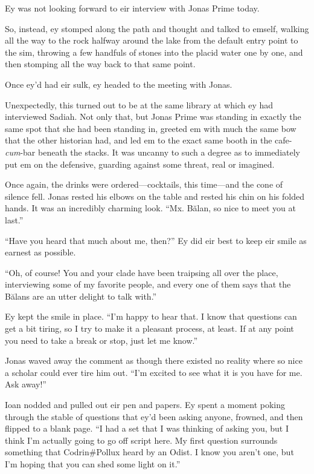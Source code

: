 Ey was not looking forward to eir interview with Jonas Prime today.

So, instead, ey stomped along the path and thought and talked to emself, walking all the way to the rock halfway around the lake from the default entry point to the sim, throwing a few handfuls of stones into the placid water one by one, and then stomping all the way back to that same point.

Once ey'd had eir sulk, ey headed to the meeting with Jonas.

Unexpectedly, this turned out to be at the same library at which ey had interviewed Sadiah. Not only that, but Jonas Prime was standing in exactly the same spot that she had been standing in, greeted em with much the same bow that the other historian had, and led em to the exact same booth in the cafe-\emph{cum}-bar beneath the stacks. It was uncanny to such a degree as to immediately put em on the defensive, guarding against some threat, real or imagined.

Once again, the drinks were ordered---cocktails, this time---and the cone of silence fell. Jonas rested his elbows on the table and rested his chin on his folded hands. It was an incredibly charming look. ``Mx. Bălan, so nice to meet you at last.''

``Have you heard that much about me, then?'' Ey did eir best to keep eir smile as earnest as possible.

``Oh, of course! You and your clade have been traipsing all over the place, interviewing some of my favorite people, and every one of them says that the Bălans are an utter delight to talk with.''

Ey kept the smile in place. ``I'm happy to hear that. I know that questions can get a bit tiring, so I try to make it a pleasant process, at least. If at any point you need to take a break or stop, just let me know.''

Jonas waved away the comment as though there existed no reality where so nice a scholar could ever tire him out. ``I'm excited to see what it is you have for me. Ask away!''

Ioan nodded and pulled out eir pen and papers. Ey spent a moment poking through the stable of questions that ey'd been asking anyone, frowned, and then flipped to a blank page. ``I had a set that I was thinking of asking you, but I think I'm actually going to go off script here. My first question surrounds something that Codrin\#Pollux heard by an Odist. I know you aren't one, but I'm hoping that you can shed some light on it.''

